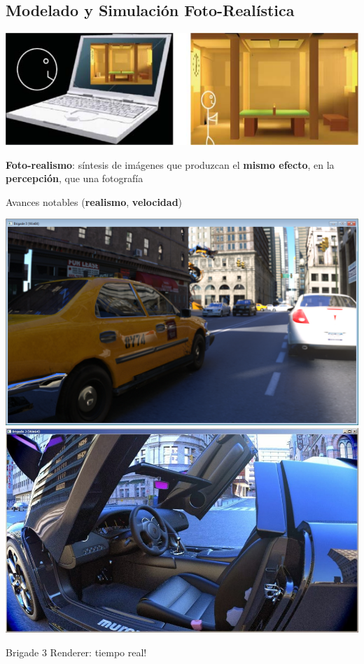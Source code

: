 \documentclass[spanish,unknownkeysallowed,10pt]{beamer}
\begin{document}
\subsection{Modelado y Simulación Foto-Realística}
\begin{frame}{}

\centerline{\includegraphics[scale = 0.2]{../figures/fotorealismo}}

\textbf{Foto-realismo}: síntesis de imágenes que produzcan el \textbf{mismo efecto}, en la \textbf{percepción}, que una fotografía

\vspace{0.2cm}

Avances notables (\textbf{realismo}, \textbf{velocidad})

\includegraphics[scale = 0.15]{../figures/brigade3}
\includegraphics[scale = 0.15]{../figures/brigade3_2}

Brigade 3 Renderer: tiempo real!

\end{frame}
\end{document}
